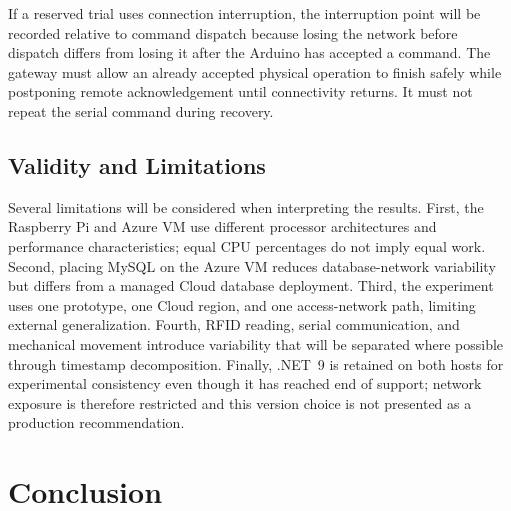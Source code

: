\documentclass[conference]{IEEEtran}
\begin{document}
If a reserved trial uses connection interruption, the interruption point will be recorded relative to command dispatch because losing the network before dispatch differs from losing it after the Arduino has accepted a command. The gateway must allow an already accepted physical operation to finish safely while postponing remote acknowledgement until connectivity returns. It must not repeat the serial command during recovery.

\subsection{Validity and Limitations}
Several limitations will be considered when interpreting the results. First, the Raspberry Pi and Azure VM use different processor architectures and performance characteristics; equal CPU percentages do not imply equal work. Second, placing MySQL on the Azure VM reduces database-network variability but differs from a managed Cloud database deployment. Third, the experiment uses one prototype, one Cloud region, and one access-network path, limiting external generalization. Fourth, RFID reading, serial communication, and mechanical movement introduce variability that will be separated where possible through timestamp decomposition. Finally, .NET~9 is retained on both hosts for experimental consistency even though it has reached end of support; network exposure is therefore restricted and this version choice is not presented as a production recommendation.

\section{Conclusion}



\end{document}

